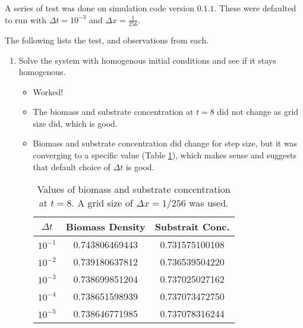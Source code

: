   A series of test was done on simulation code version $0.1.1$. These were defaulted to run with $\Delta t = 10^{-3}$ and $\Delta x = \frac{1}{256}$.
  
  The following lists the test, and observations from each.
  
  \begin{enumerate}
    \item Solve the system with homogenous initial conditions and see if it stays homogenous.
      \begin{itemize}
        \item Worked!
        \item The biomass and substrate concentration at $t=8$ did not change as grid size did, which is good. 
        \item Biomass and substrate concentration did change for step size, but it was converging to a specific value (Table \ref{tab:homoIC}), which makes sense and suggests that default choice of $\Delta t$ is good.
        \begin{table}
          \begin{center}
            \begin{tabular}{| c | c | c |}
              \hline
              $\Delta t$ & Biomass Density & Substrait Conc. \\
              \hline
              $10^{-1}$ & 0.743806469443 & 0.731575100108\\
              $10^{-2}$ & 0.739180637812 & 0.736539504220\\
              $10^{-3}$ & 0.738699851204 & 0.737025027162 \\
              $10^{-4}$ & 0.738651598939 & 0.737073472750\\
              $10^{-5}$ & 0.738646771985 & 0.737078316244\\
              \hline
            \end{tabular}
            \caption{Values of biomass and substrate concentration at $t = 8$. A grid size of $\Delta x = 1/256$ was used.}
            \label{tab:homoIC}
          \end{center}
        \end{table}
      \end{itemize}

  

\end{enumerate}
